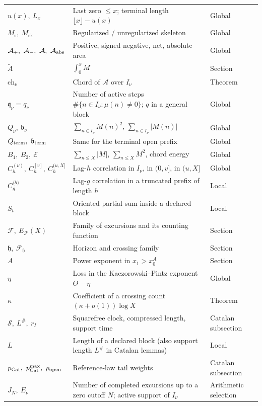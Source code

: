 \documentclass[11pt,reqno]{amsart}
\makeatletter
\let\CG@origref\ref
\newcommand{\CG@gettip}[1]{\@ifundefined{CGTip@#1}{Reference: #1}{\csname CGTip@#1\endcsname}}
\DeclareRobustCommand{\CGref}[1]{\pdftooltip{\CG@origref{#1}}{\CG@gettip{#1}}}
\numberwithin{equation}{section}
\theoremstyle{plain}
\theoremstyle{definition}
\theoremstyle{remark}
\newcommand{\Ms}{M_{\mathrm{s}}}
\newcommand{\Msk}{M_{\mathrm{sk}}}
\newcommand{\Ap}{\mathcal{A}_{+}}
\newcommand{\Am}{\mathcal{A}_{-}}
\newcommand{\Anet}{\mathcal{A}}
\newcommand{\Sq}{\mathcal{S}}
\newcommand{\En}{\mathcal{E}}
\newcommand{\F}{\mathcal{F}}
\makeatother
\begin{document}
\begin{longtable}{@{}p{}p{}p{}@{}}
$u(x),\ L_x$ & Last zero $\le x$; terminal length $\lfloor x\rfloor-u(x)$ & Global\\
$\Ms,\ \Msk$ & Regularized / unregularized skeleton & Global\\
$\Ap,\ \Am,\ \Anet,\ \mathcal A_{\rm abs}$ & Positive, signed negative, net, absolute area & Global\\
$\widetilde A$ & $\int_0^xM$ & Section~\CGref{sec:zeta}\\
$\mathrm{ch}_\nu$ & Chord of $\Anet$ over $I_\nu$ & Theorem~\CGref{thm:energy}\\
$\mathfrak q_\nu=q_\nu$ & Number of active steps $\#\{n\in I_\nu:\mu(n)\ne0\}$; $q$ in a general block & Global\\
$Q_\nu,\ \mathfrak b_\nu$ & $\sum_{n\in I_\nu}M(n)^2$, $\sum_{n\in I_\nu}|M(n)|$ & Global\\
$Q_{\rm term},\ \mathfrak b_{\rm term}$ & Same for the terminal open prefix & Global\\
$B_1,\ B_2,\ \En$ & $\sum_{n\le X}|M|$, $\sum_{n\le X}M^2$, chord energy & Global\\
$C_h^{(\nu)},\ C_h^{[v]},\ C_h^{(u,X]}$ & Lag-$h$ correlation in $I_\nu$, in $(0,v]$, in $(u,X]$ & Global\\
$C_g^{\langle h\rangle}$ & Lag-$g$ correlation in a truncated prefix of length $h$ & Local\\
$S_t$ & Oriented partial sum inside a declared block & Local\\
$\F,\ E_\F(X)$ & Family of excursions and its counting function & Section~\CGref{sec:lacunary}\\
$\mathfrak h,\ \F_{\mathfrak h}$ & Horizon and crossing family & Section~\CGref{sec:lacunary}\\
$A$ & Power exponent in $x_1>x_0^A$ & Section~\CGref{sec:lacunary}\\
$\eta$ & Loss in the Kaczorowski--Pintz exponent $\Theta-\eta$ & Global\\
$\kappa$ & Coefficient of a crossing count $(\kappa+o(1))\log X$ & Theorem~\CGref{thm:horizon}\\
$\Sq,\ L^\#,\ r_I$ & Squarefree clock, compressed length, support time & Catalan subsection\\
$L$ & Length of a declared block (also support length $L^\#$ in Catalan lemmas) & Local\\
$p_{\rm Cat},\ p^{\max}_{\rm Cat},\ p_{\rm open}$ & Reference-law tail weights & Catalan subsection\\
$J_N,\ E_\nu$ & Number of completed excursions up to a zero cutoff $N$; active support of $I_\nu$ & Arithmetic selection\\

\end{longtable}
\end{document}
